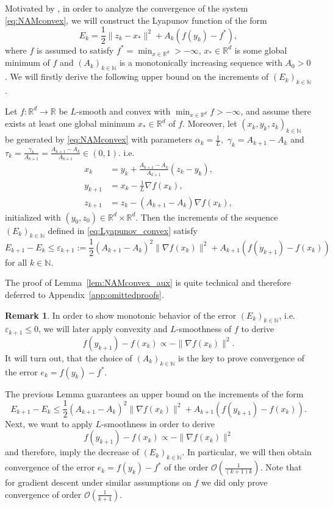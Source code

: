 \documentclass[12pt,openany]{book}
\theoremstyle{definition}
\newtheorem{remark}[thm]{Remark}
\theoremstyle{definition}
\newcommand{\N}{\mathbb{N}}
\newcommand{\R}{\mathbb{R}}
\begin{document}
Motivated by \cite{Wilson2021}, in order to analyze the convergence of the system \eqref{eq:NAMconvex}, we will construct the Lyapunov function of the form
\begin{equation}\label{eq:Lyapunov_convex}
E_k = \frac{1}{2}\|z_k-x_\ast\|^2 + A_k (f(y_k)-f^\ast),
\end{equation}
where $f$ is assumed to satisfy $f^\ast =\min_{x\in\R^d}>-\infty$, $x_\ast\in\R^d$ is some global minimum of $f$ and $(A_k)_{k\in\N}$ is a monotonically increasing sequence with $A_0>0$.  We will firstly derive the following upper bound on the increments of $(E_k)_{k\in\N}$.
\begin{lemma}\label{lem:NAMconvex_aux}
Let $f:\R^d\to\R$ be $L$-smooth and convex with $\min_{x\in\R^d} f>-\infty$, and assume there exists at least one global minimum $x_\ast\in\R^d$ of $f$.  Moreover, let $(x_k,y_k,z_k)_{k\in\N}$ be generated by \eqref{eq:NAMconvex} with parameters $\alpha_k = \frac1L,$ $\gamma_k = A_{k+1}-A_k$ and $\tau_k = \frac{\gamma_k}{A_{k+1}}=\frac{A_{k+1}-A_k}{A_{k+1}} \in(0,1)$. i.e. 
\begin{equation*}
\begin{split}
x_k &= y_k + \frac{A_{k+1}-A_k}{A_{k+1}}(z_k-y_k),\\
y_{k+1} &= x_k - \frac{1}{L} \nabla f(x_k),\\
z_{k+1} &=z_k -(A_{k+1}-A_k)\nabla f(x_k),
\end{split}
\end{equation*}
initialized with $(y_0,z_0)\in\R^{d}\times\R^d$. Then the increments of the sequence $(E_k)_{k\in\N}$ defined in \eqref{eq:Lyapunov_convex} satisfy
\[E_{k+1} - E_k \le \varepsilon_{k+1}:= \frac12 (A_{k+1}-A_k)^2 \|\nabla f(x_k)\|^2 + A_{k+1} (f(y_{k+1})-f(x_k))\]
for all $k\in\N$.
\end{lemma}
The proof of Lemma~\ref{lem:NAMconvex_aux} is quite technical and therefore deferred to Appendix~\ref{app:omittedproofs}.
\begin{remark}
In order to show monotonic behavior of the error $(E_k)_{k\in\N}$, i.e.~$\varepsilon_{k+1}\le0$, we will later apply convexity and $L$-smoothness of $f$ to derive 
\[f(y_{k+1})-f(x_k)\propto -\|\nabla f(x_k)\|^2. \]
It will turn out, that the choice of $(A_k)_{k\in\N}$ is the key to prove convergence of the error $e_k = f(y_k) -f^\ast$.
\end{remark}

The previous Lemma guarantees an upper bound on the increments of the form
\[E_{k+1}-E_k \le \frac12(A_{k+1}-A_k)^2 \|\nabla f(x_k)\|^2 + A_{k+1} (f(y_{k+1})-f(x_k)). \]
Next, we want to apply $L$-smoothness in order to derive
\[f(y_{k+1})-f(x_k)\propto -\|\nabla f(x_k)\|^2 \]
and therefore, imply the decrease of $(E_k)_{k\in\N}$. In particular, we will then obtain convergence of the error $e_k = f(y_k)-f^\ast$ of the order $\mathcal O(\frac{1}{(k+1)k})$. Note that for gradient descent under similar assumptions on $f$ we did only prove convergence of order $\mathcal O(\frac{1}{k+1})$.
\end{document}
